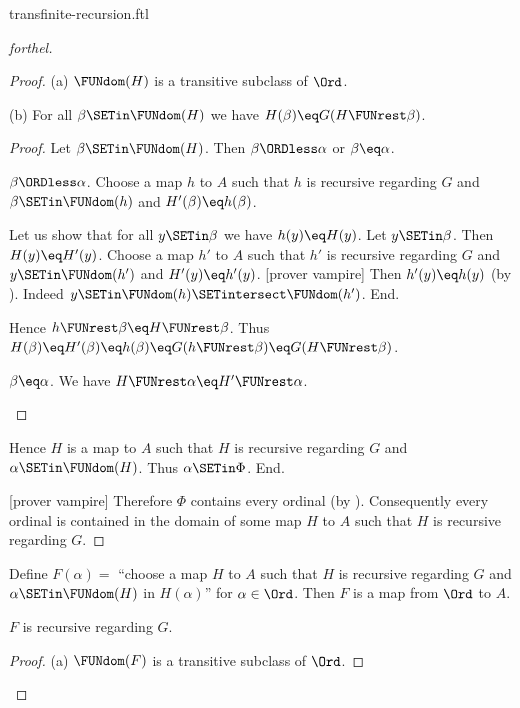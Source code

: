 \documentclass{article}
\begin{document}
\begin{smodule}{transfinite-recursion.ftl}
\begin{proof}[forthel]
\begin{proof}
      (a) $\FUNdom(H)$ is a transitive subclass of $\Ord$.

      (b) For all $\beta \SETin \FUNdom(H)$ we have $H(\beta) \eq G(H \FUNrest \beta)$.
      \begin{proof}
        Let $\beta \SETin \FUNdom(H)$.
        Then $\beta \ORDless \alpha$ or $\beta \eq \alpha$.

        \begin{case}{$\beta \ORDless \alpha$.}
          Choose a map $h$ to $A$ such that $h$ is recursive regarding $G$ and $\beta \SETin \FUNdom(h)$ and $H'(\beta) \eq h(\beta)$.

          Let us show that for all $y \SETin \beta$ we have $h(y) \eq H(y)$.
            Let $y \SETin \beta$.
            Then $H(y) \eq H'(y)$.
            Choose a map $h'$ to $A$ such that $h'$ is recursive regarding $G$ and $y \SETin \FUNdom(h')$ and $H'(y) \eq h'(y)$.
            [prover vampire]
            Then $h'(y) \eq h(y)$ (by ).
            Indeed $y \SETin \FUNdom(h) \SETintersect \FUNdom(h')$.
          End.

          Hence $h \FUNrest \beta \eq H \FUNrest \beta$.
          Thus $H(\beta)
            \eq H'(\beta)
            \eq h(\beta)
            \eq G(h \FUNrest \beta)
            \eq G(H \FUNrest \beta)$.
        \end{case}

        \begin{case}{$\beta \eq \alpha$.}
          We have $H \FUNrest \alpha \eq H' \FUNrest \alpha$.
        \end{case}
      \end{proof}

      Hence $H$ is a map to $A$ such that $H$ is recursive regarding $G$ and $\alpha \SETin \FUNdom(H)$.
      Thus $\alpha \SETin \Phi$.
    End.

    [prover vampire]
    Therefore $\Phi$ contains every ordinal (by ).
    Consequently every ordinal is contained in the domain of some map $H$ to $A$ such that $H$ is recursive regarding $G$.
  \end{proof}

  Define $F(\alpha) =$ ``choose a map $H$ to $A$ such that $H$ is recursive regarding $G$ and $\alpha \SETin \FUNdom(H)$ in $H(\alpha)$'' for $\alpha \in \Ord$.
  Then $F$ is a map from $\Ord$ to $A$.

  $F$ is recursive regarding $G$.
  \begin{proof}
    (a) $\FUNdom(F)$ is a transitive subclass of $\Ord$.


\end{proof}
\end{proof}
\end{smodule}
\end{document}
